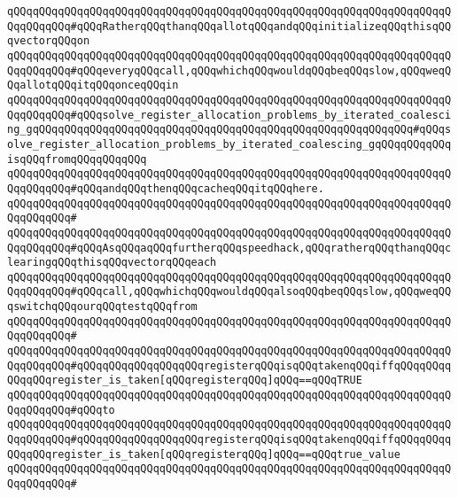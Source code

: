 \verb|qQQqqQQqqQQqqQQqqQQqqQQqqQQqqQQqqQQqqQQqqQQqqQQqqQQqqQQqqQQqqQQqqQQqqQQqqQQqqQQq#qQQqRatherqQQqthanqQQqallotqQQqandqQQqinitializeqQQqthisqQQqvectorqQQqon|\newline
\verb|qQQqqQQqqQQqqQQqqQQqqQQqqQQqqQQqqQQqqQQqqQQqqQQqqQQqqQQqqQQqqQQqqQQqqQQqqQQqqQQq#qQQqeveryqQQqcall,qQQqwhichqQQqwouldqQQqbeqQQqslow,qQQqweqQQqallotqQQqitqQQqonceqQQqin|\newline
\verb|qQQqqQQqqQQqqQQqqQQqqQQqqQQqqQQqqQQqqQQqqQQqqQQqqQQqqQQqqQQqqQQqqQQqqQQqqQQqqQQq#qQQqsolve_register_allocation_problems_by_iterated_coalescing_gqQQqqQQqqQQqqQQqqQQqqQQqqQQqqQQqqQQqqQQqqQQqqQQqqQQqqQQqqQQq#qQQqsolve_register_allocation_problems_by_iterated_coalescing_gqQQqqQQqqQQqisqQQqfromqQQqqQQqqQQq|\newline
\verb|qQQqqQQqqQQqqQQqqQQqqQQqqQQqqQQqqQQqqQQqqQQqqQQqqQQqqQQqqQQqqQQqqQQqqQQqqQQqqQQq#qQQqandqQQqthenqQQqcacheqQQqitqQQqhere.|\newline
\verb|qQQqqQQqqQQqqQQqqQQqqQQqqQQqqQQqqQQqqQQqqQQqqQQqqQQqqQQqqQQqqQQqqQQqqQQqqQQqqQQq#|\newline
\verb|qQQqqQQqqQQqqQQqqQQqqQQqqQQqqQQqqQQqqQQqqQQqqQQqqQQqqQQqqQQqqQQqqQQqqQQqqQQqqQQq#qQQqAsqQQqaqQQqfurtherqQQqspeedhack,qQQqratherqQQqthanqQQqclearingqQQqthisqQQqvectorqQQqeach|\newline
\verb|qQQqqQQqqQQqqQQqqQQqqQQqqQQqqQQqqQQqqQQqqQQqqQQqqQQqqQQqqQQqqQQqqQQqqQQqqQQqqQQq#qQQqcall,qQQqwhichqQQqwouldqQQqalsoqQQqbeqQQqslow,qQQqweqQQqswitchqQQqourqQQqtestqQQqfrom|\newline
\verb|qQQqqQQqqQQqqQQqqQQqqQQqqQQqqQQqqQQqqQQqqQQqqQQqqQQqqQQqqQQqqQQqqQQqqQQqqQQqqQQq#|\newline
\verb|qQQqqQQqqQQqqQQqqQQqqQQqqQQqqQQqqQQqqQQqqQQqqQQqqQQqqQQqqQQqqQQqqQQqqQQqqQQqqQQq#qQQqqQQqqQQqqQQqqQQqregisterqQQqisqQQqtakenqQQqiffqQQqqQQqqQQqqQQqregister_is_taken[qQQqregisterqQQq]qQQq==qQQqTRUE|\newline
\verb|qQQqqQQqqQQqqQQqqQQqqQQqqQQqqQQqqQQqqQQqqQQqqQQqqQQqqQQqqQQqqQQqqQQqqQQqqQQqqQQq#qQQqto|\newline
\verb|qQQqqQQqqQQqqQQqqQQqqQQqqQQqqQQqqQQqqQQqqQQqqQQqqQQqqQQqqQQqqQQqqQQqqQQqqQQqqQQq#qQQqqQQqqQQqqQQqqQQqregisterqQQqisqQQqtakenqQQqiffqQQqqQQqqQQqqQQqregister_is_taken[qQQqregisterqQQq]qQQq==qQQqtrue_value|\newline
\verb|qQQqqQQqqQQqqQQqqQQqqQQqqQQqqQQqqQQqqQQqqQQqqQQqqQQqqQQqqQQqqQQqqQQqqQQqqQQqqQQq#|\newline

